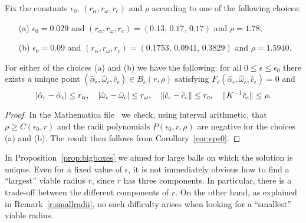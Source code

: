 \begin{proposition}
		\label{prop:bigboxes}
Fix the constants $ \epsilon_0$, $(r_\alpha, r_\omega,r_c)$  and $\rho$ according to one of the following choices:
\begin{enumerate}
	\item[\textup{(a)}]  $ \epsilon_0 = 0.029 $ and $ (r_\alpha , r_ \omega , r_c) = (  0.13, \, 0.17 , \, 0.17 ) $ and $\rho = 1.78$; 
	\item[\textup{(b)}]  $ \epsilon_0 = 0.09 $ and $ (r_\alpha , r_ \omega , r_c) = (  0.1753, \, 0.0941 , \, 0.3829 ) $ and $\rho = 1.5940$. 
\end{enumerate}
For either of the choices (a) and (b) we have the following: 
for all $0 \leq \epsilon \leq \epsilon_0$ there exists a unique point 
$(\hat{\alpha}_\epsilon,\hat{\omega}_\epsilon,\hat{c}_\epsilon) \in B_{\epsilon}(r,\rho)$ 
satisfying $F_\epsilon(\hat{\alpha}_\epsilon,\hat{\omega}_\epsilon,\hat{c}_\epsilon) = 0$ and 
\[ 	
 | \hat{\alpha}_\epsilon - \bar{\alpha}_\epsilon| \leq r_\alpha , 
 \quad
 |\hat{\omega}_\epsilon - \bar{\omega}_\epsilon| \leq  r_\omega  ,
 \quad
 \| \hat{c}_\epsilon - \bar{c}_\epsilon\| \leq r_c     ,
 \quad
 \| K^{-1} \hat{c}_\epsilon \| \leq \rho  .
\]
\end{proposition}
\begin{proof}
In the Mathematica file~\cite{mathematicafile}  we check, using interval arithmetic, that  $\rho \geq C(\epsilon_0, r)$ and  the radii polynomials $P(\epsilon_0,r,\rho)$ are negative for the choices (a) and (b). The result then follows from Corollary~\ref{cor:eps0}.	
\end{proof}


\begin{remark}\label{r:largeradii}	
In Proposition~\ref{prop:bigboxes} we aimed for large balls on which the solution is unique.
Even for a fixed value of $ \epsilon$, it is not immediately obvious how to find a ``largest'' viable radius $r$, 
since $r$ has three components. In particular, there is a trade-off between the different components of $r$. On the other hand, as explained in Remark~\ref{r:smallradii}, no such difficulty arises when looking for a ``smallest'' viable radius.
\end{remark}





